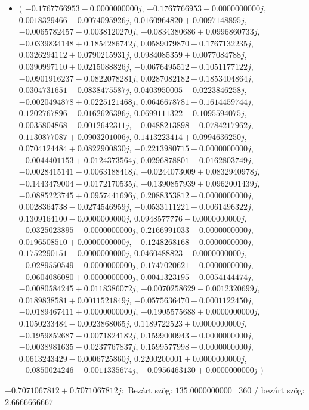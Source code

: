 \documentclass[14pt,a4paper]{article}
\begin{document}
\begin{itemize}
\item
$\big($
$-0.1767766953-0.0000000000j$, $-0.1767766953-0.0000000000j$, $0.0018329466-0.0074095926j$, $0.0160964820+0.0097148895j$, $-0.0065782457-0.0038120270j$, $-0.0834380686+0.0996860733j$, $-0.0339834148+0.1854286742j$, $0.0589079870+0.1767132235j$, $0.0326294112+0.0790215931j$, $0.0984085359+0.0077084788j$, $0.0390997110+0.0215088826j$, $-0.0676495512-0.1051177122j$, $-0.0901916237-0.0822078281j$, $0.0287082182+0.1853404864j$, $0.0304731651-0.0838475587j$, $0.0403950005-0.0223846258j$, $-0.0020494878+0.0225121468j$, $0.0646678781-0.1614459744j$, $0.1202767896-0.0162626396j$, $0.0699111322-0.1095594075j$, $0.0035804868-0.0012642311j$, $-0.0488213898-0.0784217962j$, $0.1130877087+0.0903201006j$, $0.1413223414+0.0994636250j$, $0.0704124484+0.0822900830j$, $-0.2213980715-0.0000000000j$, $-0.0044401153+0.0124373564j$, $0.0296878801-0.0162803749j$, $-0.0028415141-0.0063188418j$, $-0.0244073009+0.0832940978j$, $-0.1443479004-0.0172170535j$, $-0.1390857939+0.0962001439j$, $-0.0885223745+0.0957441696j$, $0.2088353812+0.0000000000j$, $0.0028364738-0.0274546959j$, $-0.0533111221-0.0061496322j$, $0.1309164100-0.0000000000j$, $0.0948577776-0.0000000000j$, $-0.0325023895-0.0000000000j$, $0.2166991033-0.0000000000j$, $0.0196508510+0.0000000000j$, $-0.1248268168-0.0000000000j$, $0.1752290151-0.0000000000j$, $0.0460488823-0.0000000000j$, $-0.0289550549-0.0000000000j$, $0.1747020621+0.0000000000j$, $-0.0604086080+0.0000000000j$, $0.0041323195-0.0054144474j$, $-0.0080584245+0.0118386072j$, $-0.0070258629-0.0012320699j$, $0.0189838581+0.0011521849j$, $-0.0575636470+0.0001122450j$, $-0.0189467411+0.0000000000j$, $-0.1905575688+0.0000000000j$, $0.1050233484-0.0023868065j$, $0.1189722523+0.0000000000j$, $-0.1959852687-0.0071824182j$, $0.1599000943+0.0000000000j$, $-0.0038981635-0.0237767837j$, $0.1599577998+0.0000000000j$, $0.0613243429-0.0006725860j$, $0.2200200001+0.0000000000j$, $-0.0850024246-0.0011335674j$, $-0.0956463130+0.0000000000j$
$\big)$
\end{itemize}
$-0.7071067812+0.7071067812j$:\
Bezárt szög: $135.0000000000$ \
360 / bezárt szög: $2.6666666667$\
\end{document}

